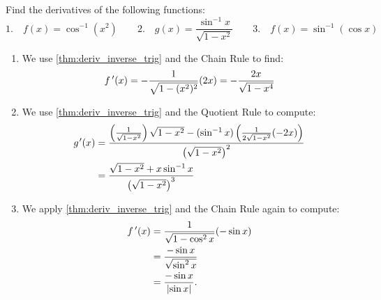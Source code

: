 %

\begin{example}\label{eg_inv_derivs}%
Find the derivatives of the following functions:
\[
 \text{1.}\quad f(x)=\cos^{-1}(x^2)\qquad
 \text{2.}\quad g(x)=\frac{\sin^{-1}x}{\sqrt{1-x^2}}\qquad
 \text{3.}\quad f(x)=\sin^{-1}(\cos x)
\]
\solution
\begin{enumerate}
\item We use \autoref{thm:deriv_inverse_trig} and the Chain Rule to find:
\[f\,'(x)=-\frac{1}{\sqrt{1-(x^2)^2}}(2x)=- \frac{2x}{\sqrt{1-x^4}}\]
\item We use \autoref{thm:deriv_inverse_trig} and the Quotient Rule to compute: 
\begin{align*}
 g\primeskip'(x)
 &=\frac{\left(\frac 1{\sqrt{1-x^2}}\right)\sqrt{1-x^2} - (\sin^{-1} x)\left( \frac 1{2\sqrt{1-x^2}} (-2x)\right)}{\left(\sqrt{1-x^2}\right)^2}\\
 &=\frac{\sqrt{1-x^2}+x\sin^{-1}x}{\left(\sqrt{1-x^2}\right)^3}
\end{align*}
\item We apply \autoref{thm:deriv_inverse_trig} and the Chain Rule again to compute:
\begin{align*}
 f\,'(x)&=\frac{1}{\sqrt{1-\cos^2x}}(-\sin x)\\
 &=\frac{-\sin x}{\sqrt{\sin^2x}}\\
 &=\frac{-\sin x}{\left\lvert \sin x \right\rvert}.
\end{align*}
\end{enumerate}
\end{example}

